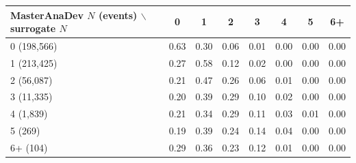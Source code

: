 \begin{tabular}{lccccccc}
\toprule
MasterAnaDev $N$ (events) $\backslash$ surrogate $N$ & 0 & 1 & 2 & 3 & 4 & 5 & 6+ \\
\midrule
0 (198,566) & 0.63 & 0.30 & 0.06 & 0.01 & 0.00 & 0.00 & 0.00 \\
1 (213,425) & 0.27 & 0.58 & 0.12 & 0.02 & 0.00 & 0.00 & 0.00 \\
2 (56,087) & 0.21 & 0.47 & 0.26 & 0.06 & 0.01 & 0.00 & 0.00 \\
3 (11,335) & 0.20 & 0.39 & 0.29 & 0.10 & 0.02 & 0.00 & 0.00 \\
4 (1,839) & 0.21 & 0.34 & 0.29 & 0.11 & 0.03 & 0.01 & 0.00 \\
5 (269) & 0.19 & 0.39 & 0.24 & 0.14 & 0.04 & 0.00 & 0.00 \\
6+ (104) & 0.29 & 0.36 & 0.23 & 0.12 & 0.01 & 0.00 & 0.00 \\
\bottomrule
\end{tabular}
